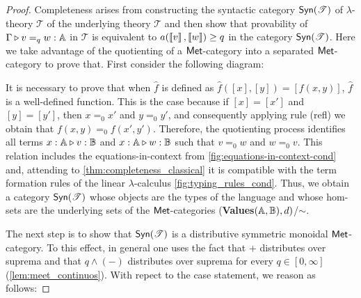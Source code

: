 \begin{proof}
  Completeness arises from constructing the syntactic category $\mathsf{Syn}(\mathscr{T})$ of  $\lambda$-theory $\mathscr{T}$   of the underlying  theory
  $\mathscr{T}$ and then show that provability of $\Gamma \triangleright v =_q w : \mathbb{A}$
  in $\mathscr{T}$ is equivalent to $a(\left \llbracket v \right \rrbracket,\left \llbracket w \right \rrbracket) \geq q$ in the category
  $\mathsf{Syn}(\mathscr{T})$. Here we take advantage of the quotienting of a  $\mathsf{Met}$-category into a separated  $\mathsf{Met}$-category to prove that. First consider the following diagram:

  \vspace{10pt}



  It is necessary to prove that when $\hat{f}$ is defined as $\hat{f}([x],[y]) = [f(x,y)]$, $\hat{f}$ is a well-defined function. This is the case because if $[x] = [x']$ and $[y] = [y']$, then $x =_0 x'$ and $y =_0 y'$, and consequently applying rule  (refl) we obtain that $f(x,y) =_0 f(x',y')$. Therefore, the quotienting process identifies all terms $x : \mathbb{A} \triangleright v : \mathbb{B}$ and $x : \mathbb{A} \triangleright w : \mathbb{B}$ such that $v =_0 w$ and $w =_0 v$. This relation includes the equations-in-context from \autoref{fig:equations-in-context-cond} and, attending to \autoref{thm:completeness_classical} it is compatible with the term formation rules of the linear $\lambda$-calculus \autoref{fig:typing_rules_cond}. Thus, we obtain a category $\mathsf{Syn}(\mathscr{T})$ whose objects are the types of the language and whose hom-sets are the underlying sets of the  $\mathsf{Met}$-categories (\textbf{Values}$(\mathbb{A},\mathbb{B}),d)$/$\sim$.


  The next step is to show that $\mathsf{Syn}(\mathscr{T})$ is a distributive symmetric monoidal $\mathsf{Met}$-category. To this effect, in general one uses the fact that $+$ distributes over suprema and that $q \wedge (-)$
  distributes over suprema for every $q \in [0, \infty]$  (\autoref{lem:meet_continuos}). With repect to the case statement, we reason as follows:


\end{proof}
